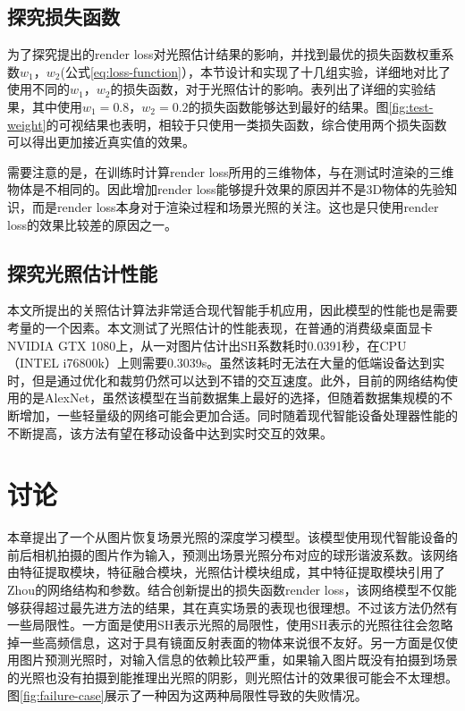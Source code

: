 \subsection{探究损失函数}

为了探究提出的render loss对光照估计结果的影响，并找到最优的损失函数权重系数$w_1$，$w_2$(公式\ref{eq:loss-function}），本节设计和实现了十几组实验，详细地对比了使用不同的$w_1$，$w_2$的损失函数，对于光照估计的影响。表列出了详细的实验结果，其中使用$w_1=0.8$，$w_2=0.2$的损失函数能够达到最好的结果。图\ref{fig:test-weight}的可视结果也表明，相较于只使用一类损失函数，综合使用两个损失函数可以得出更加接近真实值的效果。



需要注意的是，在训练时计算render loss所用的三维物体，与在测试时渲染的三维物体是不相同的。因此增加render loss能够提升效果的原因并不是3D物体的先验知识，而是render loss本身对于渲染过程和场景光照的关注。这也是只使用render loss的效果比较差的原因之一。
\subsection{探究光照估计性能}
本文所提出的关照估计算法非常适合现代智能手机应用，因此模型的性能也是需要考量的一个因素。本文测试了光照估计的性能表现，在普通的消费级桌面显卡NVIDIA GTX 1080上，从一对图片估计出SH系数耗时0.0391秒，在CPU（INTEL i76800k）上则需要0.3039s。虽然该耗时无法在大量的低端设备达到实时，但是通过优化和裁剪仍然可以达到不错的交互速度。此外，目前的网络结构使用的是AlexNet，虽然该模型在当前数据集上最好的选择，但随着数据集规模的不断增加，一些轻量级的网络可能会更加合适。同时随着现代智能设备处理器性能的不断提高，该方法有望在移动设备中达到实时交互的效果。
\section{讨论}
本章提出了一个从图片恢复场景光照的深度学习模型。该模型使用现代智能设备的前后相机拍摄的图片作为输入，预测出场景光照分布对应的球形谐波系数。该网络由特征提取模块，特征融合模块，光照估计模块组成，其中特征提取模块引用了Zhou\cite{zhou2017places}的网络结构和参数。结合创新提出的损失函数render loss，该网络模型不仅能够获得超过最先进方法的结果，其在真实场景的表现也很理想。不过该方法仍然有一些局限性。一方面是使用SH表示光照的局限性，使用SH表示的光照往往会忽略掉一些高频信息，这对于具有镜面反射表面的物体来说很不友好。另一方面是仅使用图片预测光照时，对输入信息的依赖比较严重，如果输入图片既没有拍摄到场景的光照也没有拍摄到能推理出光照的阴影，则光照估计的效果很可能会不太理想。图\ref{fig:failure-case}展示了一种因为这两种局限性导致的失败情况。



